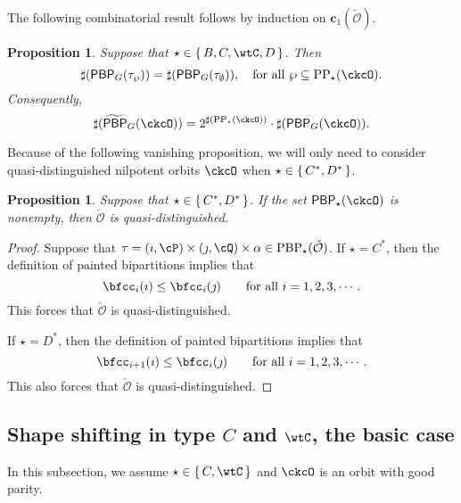 \documentclass[12pt,a4paper]{amsart}
\def\subset{\subseteq}
\newcommand{\CO}{{\mathcal {O}}}
\numberwithin{equation}{section}
\newtheorem{prop}[thm]{Proposition}
\theoremstyle{remark}
\def\CPPs{\mathrm{PP}_{\star}}
\def\tPBP{\widetilde{\mathsf{PBP}}}
\def\PBP{\mathsf{PBP}}
\def\tPBP{\widetilde{\mathsf{PBP}}}
\begin{document}
    \smallskip

The following combinatorial result follows by induction on $\mathbf c_1(\check \CO)$.

\begin{prop} \label{prop:PBP2} Suppose that   $\star\in \set{B,C,\wtC,D}$. Then
  \[
    \sharp(\PBP_{G}(\tau_{\wp})) = \sharp(\PBP_{G}(\tau_{\emptyset})), \quad \textrm{for all } \wp \subset \CPPs(\ckcO).
  \]
 Consequently,
     \[
     \sharp(\tPBP_{G}(\ckcO)) = 2^{\sharp(\CPPs(\ckcO))}\cdot \sharp(\PBP_{G}(\ckcO)).
  \]
\end{prop}


Because of the following vanishing proposition, we will only need to consider
quasi-distinguished nilpotent orbits $\ckcO$ when $\star\in \set{C^*, D^*}$.

\begin{prop}\label{prop:CD*}
  Suppose that $\star\in \set{C^*, D^*}$. If the set $\PBP_\star(\ckcO)$ is nonempty, then $\check \CO$ is quasi-distinguished.
\end{prop}
\begin{proof}
  Suppose that $\tau=(\imath,\cP)\times(\jmath,\cQ)\times \alpha \in  \mathrm{PBP}_\star(\check \CO)$. If  $\star=C^*$, then  the definition of painted bipartitions implies that
 \[
 \bfcc_i(\imath)\leq \bfcc_i(\jmath) \qquad \textrm{for all } i=1,2,3, \cdots.
 \]
This forces that $\check \CO$ is quasi-distinguished.

 If  $\star=D^*$, then  the definition of painted bipartitions implies that
 \[
 \bfcc_{i+1}(\imath)\leq \bfcc_i(\jmath) \qquad \textrm{for all } i=1,2,3, \cdots.
 \]
This  also forces that   $\check \CO$ is quasi-distinguished.
 \end{proof}


 \subsection{Shape shifting in type $C$ and $\wtC$, the basic case}
 In this subsection, we assume $\star \in \set{C,\wtC}$ and $\ckcO$ is an orbit
 with good parity.
\end{document}
